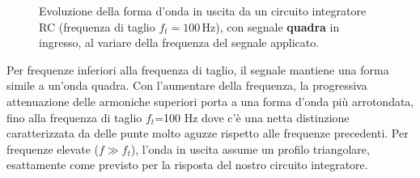 \documentclass[10pt,a4paper]{article}
\begin{document}
\begin{figure}[H]
    \vspace{-0.3cm}
    
    \caption{Evoluzione della forma d’onda in uscita da un circuito integratore RC (frequenza di taglio \( f_t = 100 \, \text{Hz} \)), con segnale \textbf{quadra} in ingresso, al variare della frequenza del segnale applicato.}
    \label{fig:imgsq}
\end{figure}
Per frequenze inferiori alla frequenza di taglio, il segnale mantiene una forma simile a un’onda quadra. Con l’aumentare della frequenza, la progressiva attenuazione delle armoniche superiori porta a una forma d’onda più arrotondata, fino alla frequenza di taglio \(f_t \)=100 Hz dove c'è una netta distinzione caratterizzata da delle punte molto aguzze rispetto alle frequenze precedenti. Per frequenze elevate (\( f \gg f_t \)), l’onda in uscita assume un profilo triangolare, esattamente come previsto per la risposta del nostro circuito integratore.
\end{document}
